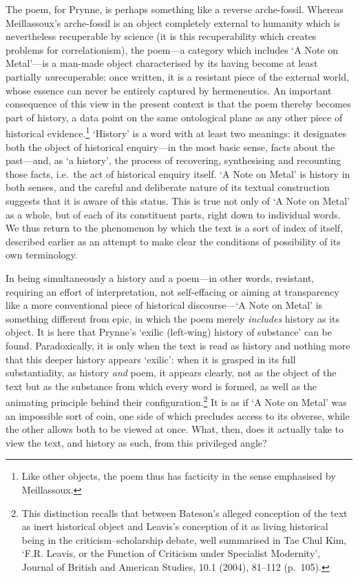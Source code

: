 \documentclass[]{article}
\begin{document}
The poem, for Prynne, is perhaps something like a reverse arche-fossil.
Whereas Meillassoux's arche-fossil is an object completely external to
humanity which is nevertheless recuperable by science (it is this
recuperability which creates problems for correlationism), the poem---a
category which includes `A Note on Metal'---is a man-made object
characterised by its having become at least partially
\emph{un}recuperable: once written, it is a resistant piece of the
external world, whose essence can never be entirely captured by
hermeneutics. An important consequence of this view in the present
context is that the poem thereby becomes part of history, a data point
on the same ontological plane as any other piece of historical
evidence.\footnote{Like other objects, the poem thus has facticity in
  the sense emphasised by Meillassoux.} `History' is a word with at
least two meanings: it designates both the object of historical
enquiry---in the most basic sense, facts about the past---and, as `a
history', the process of recovering, synthesising and recounting those
facts, i.e.~the act of historical enquiry itself. `A Note on Metal' is
history in both senses, and the careful and deliberate nature of its
textual construction suggests that it is aware of this status. This is
true not only of `A Note on Metal' as a whole, but of each of its
constituent parts, right down to individual words. We thus return to the
phenomenon by which the text is a sort of index of itself, described
earlier as an attempt to make clear the conditions of possibility of its
own terminology.

In being simultaneously a history and a poem---in other words,
resistant, requiring an effort of interpretation, not self-effacing or
aiming at transparency like a more conventional piece of historical
discourse---`A Note on Metal' is something different from epic, in which
the poem merely \emph{includes} history as its object. It is here that
Prynne's `exilic (left-wing) history of substance' can be found.
Paradoxically, it is only when the text is read as history and nothing
more that this deeper history appears `exilic': when it is grasped in
its full substantiality, as history \emph{and} poem, it appears clearly,
not as the object of the text but as the substance from which every word
is formed, as well as the animating principle behind their
configuration.\footnote{This distinction recalls that between Bateson's
  alleged conception of the text as inert historical object and Leavis's
  conception of it as living historical being in the
  criticism--scholarship debate, well summarised in Tae Chul Kim, `F.R.
  Leavis, or the Function of Criticism under Specialist Modernity',
  Journal of British and American Studies, 10.1 (2004), 81--112
  (p.~105).} It is as if `A Note on Metal' was an impossible sort of
coin, one side of which precludes access to its obverse, while the other
allows both to be viewed at once. What, then, does it actually take to
view the text, and history as such, from this privileged angle?
\end{document}

